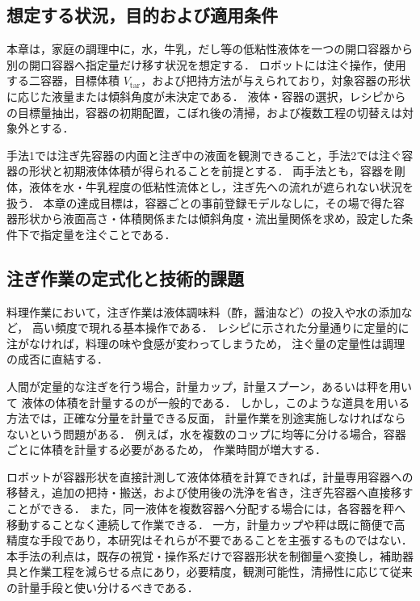 \begin{revisionblock}
\subsection{想定する状況，目的および適用条件}
本章は，家庭の調理中に，水，牛乳，だし等の低粘性液体を一つの開口容器から別の開口容器へ指定量だけ移す状況を想定する．
ロボットには注ぐ操作，使用する二容器，目標体積 $V_{\mathrm{tar}}$，および把持方法が与えられており，対象容器の形状に応じた液量または傾斜角度が未決定である．
液体・容器の選択，レシピからの目標量抽出，容器の初期配置，こぼれ後の清掃，および複数工程の切替えは対象外とする．

手法1では注ぎ先容器の内面と注ぎ中の液面を観測できること，手法2では注ぐ容器の形状と初期液体体積が得られることを前提とする．
両手法とも，容器を剛体，液体を水・牛乳程度の低粘性流体とし，注ぎ先への流れが遮られない状況を扱う．
本章の達成目標は，容器ごとの事前登録モデルなしに，その場で得た容器形状から液面高さ・体積関係または傾斜角度・流出量関係を求め，設定した条件下で指定量を注ぐことである．
\end{revisionblock}

\subsection{注ぎ作業の定式化と技術的課題}

料理作業において，注ぎ作業は液体調味料（酢，醤油など）の投入や水の添加など，
高い頻度で現れる基本操作である．
レシピに示された分量通りに定量的に注がなければ，料理の味や食感が変わってしまうため，
注ぐ量の定量性は調理の成否に直結する．

人間が定量的な注ぎを行う場合，計量カップ，計量スプーン，あるいは秤を用いて
液体の体積を計量するのが一般的である．
しかし，このような道具を用いる方法では，正確な分量を計量できる反面，
計量作業を別途実施しなければならないという問題がある．
例えば，水を複数のコップに均等に分ける場合，容器ごとに体積を計量する必要があるため，
作業時間が増大する．
\begin{revisionblock}
ロボットが容器形状を直接計測して液体体積を計算できれば，計量専用容器への移替え，追加の把持・搬送，および使用後の洗浄を省き，注ぎ先容器へ直接移すことができる．
また，同一液体を複数容器へ分配する場合には，各容器を秤へ移動することなく連続して作業できる．
一方，計量カップや秤は既に簡便で高精度な手段であり，本研究はそれらが不要であることを主張するものではない．
本手法の利点は，既存の視覚・操作系だけで容器形状を制御量へ変換し，補助器具と作業工程を減らせる点にあり，必要精度，観測可能性，清掃性に応じて従来の計量手段と使い分けるべきである．
\end{revisionblock}

